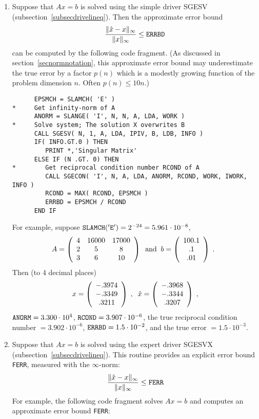 \begin{enumerate}
\item Suppose that $Ax=b$ is solved using the simple driver SGESV
(subsection~\ref{subsecdrivelineq}).
Then the approximate error bound
\[
\frac{\| \hat{x} - x \|_{\infty}}{\|x\|_{\infty}} \leq {\tt ERRBD}
\]
can be computed by the following code fragment.
(As discussed in
section~\ref{secnormnotation}, this approximate error bound
may underestimate the true error by a factor $p(n)$
which is a modestly growing function of the problem dimension $n$.
Often $p(n) \leq 10n$.)

\begin{verbatim}
      EPSMCH = SLAMCH( 'E' )
*     Get infinity-norm of A
      ANORM = SLANGE( 'I', N, N, A, LDA, WORK )
*     Solve system; The solution X overwrites B
      CALL SGESV( N, 1, A, LDA, IPIV, B, LDB, INFO )
      IF( INFO.GT.0 ) THEN
         PRINT *,'Singular Matrix'
      ELSE IF (N .GT. 0) THEN
*        Get reciprocal condition number RCOND of A
         CALL SGECON( 'I', N, A, LDA, ANORM, RCOND, WORK, IWORK, INFO )
         RCOND = MAX( RCOND, EPSMCH )
         ERRBD = EPSMCH / RCOND
      END IF
\end{verbatim}

For example, suppose
${\tt SLAMCH('E')} = 2^{-24} = 5.961 \cdot 10^{-8}$,
\[
A = \bmat{ccc} 4 & 16000 & 17000 \\ 2 & 5 & 8 \\ 3 & 6 & 10 \emat
\; \; {\rm and} \; \;
b = \bmat{c} 100.1 \\ .1 \\ .01 \emat \; . \; \;
\]
Then (to 4 decimal places)
\[
x = \bmat{c} -.3974 \\ -.3349 \\ .3211 \emat \; , \; \;
\hat{x} = \bmat{c} -.3968 \\ -.3344 \\ .3207 \emat \; ,
\]
${\tt ANORM} = 3.300 \cdot 10^4$,
${\tt RCOND} = 3.907 \cdot 10^{-6}$,
the true reciprocal condition number $= 3.902 \cdot 10^{-6}$,
${\tt ERRBD} =  1.5 \cdot 10^{-2}$, and the true error
$= 1.5 \cdot 10^{-3}$.

\item Suppose that $Ax=b$ is solved using the expert driver SGESVX
(subsection~\ref{subsecdrivelineq}).
This routine provides an explicit error bound {\tt FERR}, measured
with the $\infty$-norm:
\[
\frac{\| \hat{x} - x \|_{\infty}}{\|x\|_{\infty}} \leq {\tt FERR}
\]
For example, the following code fragment solves
$Ax=b$ and computes an approximate error bound {\tt FERR}:


\end{enumerate}
